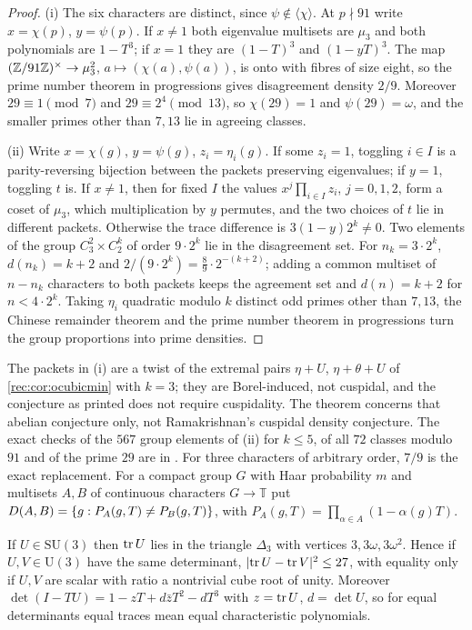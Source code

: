 \begin{proof}
(i) The six characters are distinct, since $\psi\notin\langle\chi\rangle$. At $p\nmid91$ write $x=\chi(p)$,
$y=\psi(p)$. If $x\ne1$ both eigenvalue multisets are $\mu_3$ and both polynomials are $1-T^3$; if $x=1$ they are
$(1-T)^3$ and $(1-yT)^3$. The map $(\mathbb{Z}/91\mathbb{Z})^\times\to\mu_3^2$, $a\mapsto(\chi(a),\psi(a))$, is onto with fibres of
size eight, so the prime number theorem in progressions gives disagreement density $2/9$. Moreover $29\equiv1\pmod7$
and $29\equiv2^4\pmod{13}$, so $\chi(29)=1$ and $\psi(29)=\omega$, and the smaller primes other than $7,13$ lie in
agreeing classes.

(ii) Write $x=\chi(g)$, $y=\psi(g)$, $z_i=\eta_i(g)$. If some $z_i=1$, toggling $i\in I$ is a parity-reversing
bijection between the packets preserving eigenvalues; if $y=1$, toggling $t$ is. If $x\ne1$, then for fixed $I$ the
values $x^j\prod_{i\in I}z_i$, $j=0,1,2$, form a coset of $\mu_3$, which multiplication by $y$ permutes, and the two
choices of $t$ lie in different packets. Otherwise the trace difference is $3(1-y)2^k\ne0$. Two elements of the group
$C_3^2\times C_2^k$ of order $9\cdot2^k$ lie in the disagreement set. For $n_k=3\cdot2^k$, $d(n_k)=k+2$ and
$2/(9\cdot2^k)=\frac89\cdot2^{-(k+2)}$; adding a common multiset of $n-n_k$ characters to both packets keeps the
agreement set and $d(n)=k+2$ for $n<4\cdot2^k$. Taking $\eta_i$ quadratic modulo $k$ distinct odd primes other than
$7,13$, the Chinese remainder theorem and the prime number theorem in progressions turn the group proportions into
prime densities.
\end{proof}

The packets in (i) are a twist of the extremal pairs $\eta+U$, $\eta+\theta+U$ of \cref{rec:cor:ocubicmin} with
$k=3$; they are Borel-induced, not cuspidal, and the conjecture as printed does not require cuspidality. The theorem
concerns that abelian conjecture only, not Ramakrishnan's cuspidal density conjecture. The exact checks of
the $567$ group elements of (ii) for $k\le5$, of all $72$ classes modulo $91$ and of the prime $29$ are in
. For three characters of arbitrary
order, $7/9$ is the exact replacement. For a compact group $G$ with Haar probability $m$ and multisets $A,B$ of
continuous characters $G\to\mathbb T$ put $D(A,B)=\{g:P_A(g,T)\ne P_B(g,T)\}$, with
$P_A(g,T)=\prod_{\alpha\in A}(1-\alpha(g)T)$.

\begin{lemma}\label{eul:lem:triangle}
If $U\in\mathrm{SU}(3)$ then $\operatorname{tr} U$ lies in the triangle $\Delta_3$ with vertices $3,3\omega,3\omega^2$. Hence if
$U,V\in\mathrm U(3)$ have the same determinant, $\lvert\operatorname{tr} U-\operatorname{tr} V\rvert^2\le27$, with equality only if $U,V$ are scalar with
ratio a nontrivial cube root of unity. Moreover $\det(I-TU)=1-zT+d\bar zT^2-dT^3$ with $z=\operatorname{tr} U$, $d=\det U$, so for
equal determinants equal traces mean equal characteristic polynomials.
\end{lemma}

